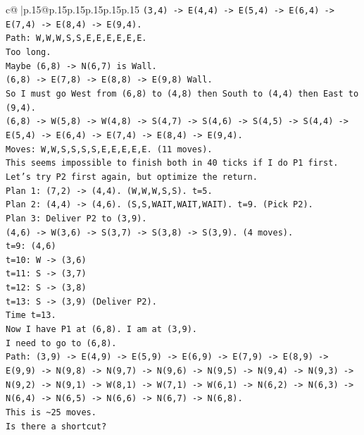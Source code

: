 \documentclass{article}
\begin{document}
{\begin{supertabular}{c@{$\;$}|p{.15\linewidth}@{}p{.15\linewidth}p{.15\linewidth}p{.15\linewidth}p{.15\linewidth}p{.15\linewidth}}
{{{\texttt{(3,4) {-}> E(4,4) {-}> E(5,4) {-}> E(6,4) {-}> E(7,4) {-}> E(8,4) {-}> E(9,4).} \\
\texttt{Path: W,W,W,S,S,E,E,E,E,E,E.} \\
\texttt{Too long.} \\
\texttt{Maybe (6,8) {-}> N(6,7) is Wall.} \\
\texttt{(6,8) {-}> E(7,8) {-}> E(8,8) {-}> E(9,8) Wall.} \\
\texttt{So I must go West from (6,8) to (4,8) then South to (4,4) then East to (9,4).} \\
\texttt{(6,8) {-}> W(5,8) {-}> W(4,8) {-}> S(4,7) {-}> S(4,6) {-}> S(4,5) {-}> S(4,4) {-}> E(5,4) {-}> E(6,4) {-}> E(7,4) {-}> E(8,4) {-}> E(9,4).} \\
\texttt{Moves: W,W,S,S,S,S,E,E,E,E,E. (11 moves).} \\
\texttt{This seems impossible to finish both in 40 ticks if I do P1 first.} \\
\texttt{Let's try P2 first again, but optimize the return.} \\
\texttt{Plan 1: (7,2) {-}> (4,4). (W,W,W,S,S). t=5.} \\
\texttt{Plan 2: (4,4) {-}> (4,6). (S,S,WAIT,WAIT,WAIT). t=9. (Pick P2).} \\
\texttt{Plan 3: Deliver P2 to (3,9).} \\
\texttt{(4,6) {-}> W(3,6) {-}> S(3,7) {-}> S(3,8) {-}> S(3,9). (4 moves).} \\
\texttt{t=9: (4,6)} \\
\texttt{t=10: W {-}> (3,6)} \\
\texttt{t=11: S {-}> (3,7)} \\
\texttt{t=12: S {-}> (3,8)} \\
\texttt{t=13: S {-}> (3,9) (Deliver P2).} \\
\texttt{Time t=13.} \\
\texttt{Now I have P1 at (6,8). I am at (3,9).} \\
\texttt{I need to go to (6,8).} \\
\texttt{Path: (3,9) {-}> E(4,9) {-}> E(5,9) {-}> E(6,9) {-}> E(7,9) {-}> E(8,9) {-}> E(9,9) {-}> N(9,8) {-}> N(9,7) {-}> N(9,6) {-}> N(9,5) {-}> N(9,4) {-}> N(9,3) {-}> N(9,2) {-}> N(9,1) {-}> W(8,1) {-}> W(7,1) {-}> W(6,1) {-}> N(6,2) {-}> N(6,3) {-}> N(6,4) {-}> N(6,5) {-}> N(6,6) {-}> N(6,7) {-}> N(6,8).} \\
\texttt{This is \textasciitilde{}25 moves.} \\
\texttt{Is there a shortcut?} \\
}}}
\end{supertabular}}
\end{document}
